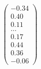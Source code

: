 \documentclass[preview]{standalone}
\begin{document}
\begin{align*}
\begin{pmatrix} -0.34 \\ 0.40 \\ 0.11 \\ \dots \\ 0.17 \\ 0.44 \\ 0.36 \\ -0.06 \end{pmatrix}
\end{align*}
\end{document}
